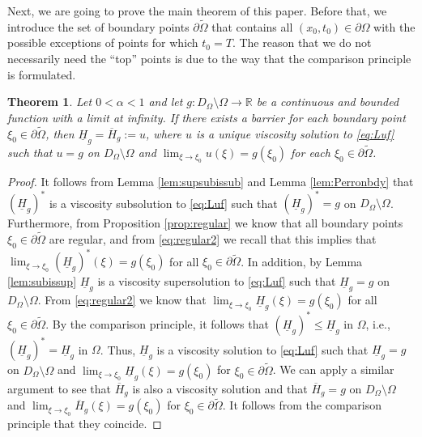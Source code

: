 \documentclass[11pt]{article}
\newcommand{\R}{\mathbb{R}}
\providecommand{\Rnp}{D_{\Omega}}
\providecommand{\RnpO}{D_{\Omega}\setminus \Omega}
\providecommand{\ups}{\overline{H}_g}
\providecommand{\lps}{\underline{H}_g}
\newtheorem{thm}{Theorem}[section]
\numberwithin{equation}{section}
\theoremstyle{definition}
\begin{document}
Next, we are going to prove the main theorem of this paper. Before that, we introduce the set of boundary points $\partial \tilde{\Omega}$ that contains all $(x_0,t_0) \in \partial \Omega$ with the possible exceptions of points for which $t_0=T.$ The reason that we do not necessarily need the ``top'' points is due to the way that the comparison principle is formulated.
\begin{thm}\label{thm:existence}
    Let $0<\alpha<1$ and let $g: \Rnp \setminus \Omega \to \R$ be a continuous and bounded function with a limit at infinity. If there exists a barrier for each boundary point $\xi_0 \in \partial \tilde{\Omega}$, then $\lps = \ups :=u$, where $u$ is a unique viscosity solution to \eqref{eq:Luf} such that $u=g$ on $\RnpO$ and $\lim_{\xi \to \xi_0}u(\xi)=g(\xi_0)$ for each $\xi_0 \in \partial \tilde{\Omega}$.
\end{thm}
\begin{proof}
   It follows from Lemma \ref{lem:supsubissub} and Lemma \ref{lem:Perronbdy} that $(\lps)^*$ is a viscosity subsolution to \eqref{eq:Luf} such that $(\lps)^*=g$ on $D_{\Omega}\setminus \Omega$. Furthermore, from Proposition \ref{prop:regular} we know that all boundary points $\xi_0 \in \partial \tilde{\Omega}$ are regular, and from \eqref{eq:regular2} we recall that this implies that $\lim_{\xi \to \xi_0}(\lps)^*(\xi) =g(\xi_0)$ for all $\xi_0 \in \partial \tilde{\Omega}$. In addition,  by Lemma \ref{lem:subissup} $\lps$ is a viscosity supersolution to \eqref{eq:Luf} such that $\lps = g$ on $D_{\Omega}\setminus \Omega$. From \eqref{eq:regular2} we know that $\lim_{\xi \to \xi_0}\lps(\xi)=g(\xi_0)$ for all $\xi_0 \in \partial \tilde{\Omega}$. By the comparison principle, it follows that $(\lps)^* \leq \lps$ in $\Omega$, i.e., $(\lps)^* = \lps$ in $\Omega$. Thus, $\lps$ is a viscosity solution to \eqref{eq:Luf} such that $\lps=g$ on $\RnpO$ and $\lim_{\xi \to \xi_0}\lps(\xi)=g(\xi_0)$ for $\xi_0 \in \partial \tilde{\Omega}$. We can apply a similar argument to see that $\ups$ is also a viscosity solution and that $\ups=g$ on $\RnpO$ and $\lim_{\xi \to \xi_0}\ups(\xi)=g(\xi_0)$ for $\xi_0 \in \partial \tilde{\Omega}$. It follows from the comparison principle that they coincide.
\end{proof}
\end{document}
